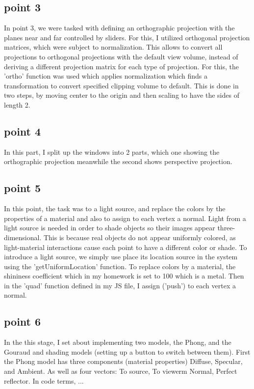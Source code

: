 \documentclass[12pt,a4paper]{article}
\begin{document}
\subsection{point 3}
In point 3, we were tasked with defining an orthographic projection with the planes near and far controlled by sliders. For this, I utilized orthogonal projection matrices, which were subject to normalization. This allows to convert all projections to orthogonal projections with the default view volume, instead of deriving a different projection matrix for each type of projection. For this, the 'ortho' function was used which applies normalization which finds a transformation to convert specified clipping volume to default. This is done in two steps, by moving center to the origin and then scaling to have the sides of length 2.

\subsection{point 4}
In this part, I split up the windows into 2 parts, which one showing the orthographic projection meanwhile the second shows perspective projection.
\subsection{point 5}
In this point, the task was to a light source, and replace the colors by the properties of a material and also to assign to each vertex a normal. Light from a light source is needed in order to shade objects so their images appear three-dimensional. This is because real objects do not appear uniformly colored, as light-material interactions cause each point to have a different color or shade. To introduce a light source, we simply use place its location source in the system using the 'getUniformLocation' function. To replace colors by a material, the shininess coefficient which in my homework is set to 100 which is a metal. Then in the 'quad' function defined in my JS file, I assign ('push') to each vertex a normal.
\subsection{point 6}
In the this stage, I set about implementing two models, the Phong, and the Gouraud and shading models (setting up a button to switch between them). First the Phong model has three components (material properties) Diffuse, Specular, and Ambient. As well as four vectors: To source, To viewerm Normal, Perfect reflector. In code terms, ...
\end{document}
